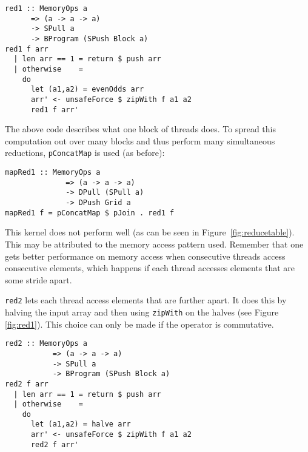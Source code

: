 \begin{small} 
\begin{Verbatim}[samepage = true] 
red1 :: MemoryOps a
      => (a -> a -> a)
      -> SPull a
      -> BProgram (SPush Block a)
red1 f arr
  | len arr == 1 = return $ push arr
  | otherwise    = 
    do
      let (a1,a2) = evenOdds arr
      arr' <- unsafeForce $ zipWith f a1 a2
      red1 f arr'   
\end{Verbatim}
\end{small}

The above code describes what one block of threads does. To spread 
this computation out over many blocks and thus perform many simultaneous 
reductions, {\tt pConcatMap} is used (as before): 

\begin{small} 
\begin{Verbatim}[samepage = true] 
mapRed1 :: MemoryOps a 
              => (a -> a -> a) 
              -> DPull (SPull a) 
              -> DPush Grid a
mapRed1 f = pConcatMap $ pJoin . red1 f
\end{Verbatim}
\end{small} %

This kernel does not perform well (as can be seen in Figure~\ref{fig:reducetable}). 
This may be attributed to the memory access pattern used. Remember that
one gets better performance on memory access when consecutive threads
access consecutive elements, which happens if
each thread accesses elements that are some stride apart. 


{\tt red2} lets each thread access elements that are further apart. It does 
this by halving the input array and then using {\tt zipWith} on the halves (see Figure~ \ref{fig:red1}). 
This choice can only be made if the operator is commutative.  

\begin{small} 
\begin{Verbatim}[samepage = true] 
red2 :: MemoryOps a
           => (a -> a -> a)
           -> SPull a
           -> BProgram (SPush Block a)
red2 f arr
  | len arr == 1 = return $ push arr
  | otherwise    = 
    do
      let (a1,a2) = halve arr
      arr' <- unsafeForce $ zipWith f a1 a2
      red2 f arr'   
\end{Verbatim}
\end{small}


